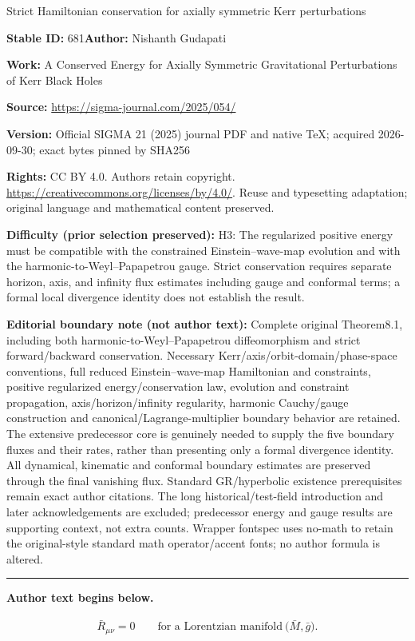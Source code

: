 \documentclass[11pt]{article}
\numberwithin{equation}{section}
\numberwithin{equation}{section}
\begin{document}
\begin{center}\Large Strict Hamiltonian conservation for axially symmetric Kerr perturbations\end{center}
\noindent\textbf{Stable ID:} 681\quad\textbf{Author:} Nishanth Gudapati\par
\noindent\textbf{Work:} A Conserved Energy for Axially Symmetric Gravitational Perturbations of Kerr Black Holes\par
\noindent\textbf{Source:} \url{https://sigma-journal.com/2025/054/}\par
\noindent\textbf{Version:} Official SIGMA 21 (2025) journal PDF and native TeX; acquired 2026-09-30; exact bytes pinned by SHA256\par
\noindent\textbf{Rights:} CC BY 4.0. Authors retain copyright. \url{https://creativecommons.org/licenses/by/4.0/}. Reuse and typesetting adaptation; original language and mathematical content preserved.\par
\noindent\textbf{Difficulty (prior selection preserved):} {\CJKfont H3: The regularized positive energy must be compatible with the constrained Einstein–wave-map evolution and with the harmonic-to-Weyl–Papapetrou gauge. Strict conservation requires separate horizon, axis, and infinity flux estimates including gauge and conformal terms; a formal local divergence identity does not establish the result.}\par
\medskip\noindent\textbf{Editorial boundary note (not author text):} Complete original Theorem8.1, including both harmonic-to-Weyl–Papapetrou diffeomorphism and strict forward/backward conservation. Necessary Kerr/axis/orbit-domain/phase-space conventions, full reduced Einstein–wave-map Hamiltonian and constraints, positive regularized energy/conservation law, evolution and constraint propagation, axis/horizon/infinity regularity, harmonic Cauchy/gauge construction and canonical/Lagrange-multiplier boundary behavior are retained. The extensive predecessor core is genuinely needed to supply the five boundary fluxes and their rates, rather than presenting only a formal divergence identity. All dynamical, kinematic and conformal boundary estimates are preserved through the final vanishing flux. Standard GR/hyperbolic existence prerequisites remain exact author citations. The long historical/test-field introduction and later acknowledgements are excluded; predecessor energy and gauge results are supporting context, not extra counts. Wrapper fontspec uses no-math to retain the original-style standard math operator/accent fonts; no author formula is altered.\par
\medskip\hrule\medskip\noindent\textbf{Author text begins below.}\par
\setcounter{section}{1}\setcounter{equation}{0}
\begin{align}\label{EVE}
\bar{R}_{\mu \nu} =0 \qquad \text{for a Lorentzian manifold} \ \bigl(\bar{M}, \bar{g}\bigr).
\end{align}
\end{document}
